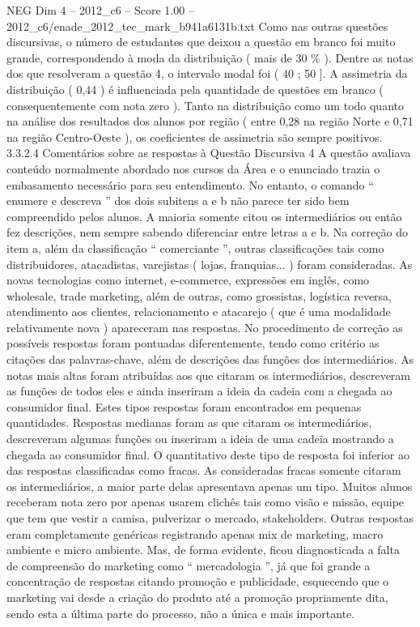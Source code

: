 \begin{textsample}{NEG Dim 4 – 2012\_c6 – Score 1.00 – 2012\_c6/enade\_2012\_tec\_mark\_b941a6131b.txt}
Como nas outras questões discursivas, o número de estudantes que deixou a questão em branco foi muito grande, correspondendo à moda da distribuição ( mais de 30 \% ).
Dentre as notas dos que resolveram a questão 4, o intervalo modal foi ( 40 ; 50 ].
A assimetria da distribuição ( 0,44 ) é influenciada pela quantidade de questões em branco ( consequentemente com nota zero ).
Tanto na distribuição como um todo quanto na análise dos resultados dos alunos por região ( entre 0,28 na região Norte e 0,71 na região Centro-Oeste ), os coeficientes de assimetria são sempre positivos. 3.3.2.4 Comentários sobre as respostas à Questão Discursiva 4 A questão avaliava conteúdo normalmente abordado nos cursos da Área e o enunciado trazia o embasamento necessário para seu entendimento.
No entanto, o comando “ enumere e descreva ” dos dois subitens a e b não parece ter sido bem compreendido pelos alunos.
A maioria somente citou os intermediários ou então fez descrições, nem sempre sabendo diferenciar entre letras a e b.
Na correção do item a, além da classificação “ comerciante ”, outras classificações tais como distribuidores, atacadistas, varejistas ( lojas, franquias... ) foram consideradas.
As novas tecnologias como internet, e-commerce, expressões em inglês, como wholesale, trade marketing, além de outras, como grossistas, logística reversa, atendimento aos clientes, relacionamento e atacarejo ( que é uma modalidade relativamente nova ) apareceram nas respostas.
No procedimento de correção as possíveis respostas foram pontuadas diferentemente, tendo como critério as citações das palavras-chave, além de descrições das funções dos intermediários.
As notas mais altas foram atribuídas aos que citaram os intermediários, descreveram as funções de todos eles e ainda inseriram a ideia da cadeia com a chegada ao consumidor final.
Estes tipos respostas foram encontrados em pequenas quantidades.
Respostas medianas foram as que citaram os intermediários, descreveram algumas funções ou inseriram a ideia de uma cadeia mostrando a chegada ao consumidor final.
O quantitativo deste tipo de resposta foi inferior ao das respostas classificadas como fracas.
As consideradas fracas somente citaram os intermediários, a maior parte delas apresentava apenas um tipo.
Muitos alunos receberam nota zero por apenas usarem clichês tais como visão e missão, equipe que tem que vestir a camisa, pulverizar o mercado, stakeholders.
Outras respostas eram completamente genéricas registrando apenas mix de marketing, macro ambiente e micro ambiente.
Mas, de forma evidente, ficou diagnosticada a falta de compreensão do marketing como “ mercadologia ”, já que foi grande a concentração de respostas citando promoção e publicidade, esquecendo que o marketing vai desde a criação do produto até a promoção propriamente dita, sendo esta a última parte do processo, não a única e mais importante.

\end{textsample}

